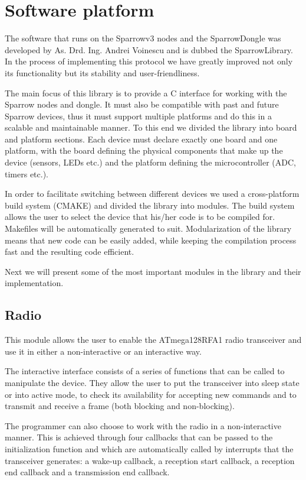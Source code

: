 
\chapter{Software platform}

The software that runs on the Sparrowv3 nodes and the SparrowDongle was
developed by As. Drd. Ing. Andrei Voinescu and is dubbed the SparrowLibrary.
In the process of implementing this protocol we have greatly improved not only
its functionality but its stability and user-friendliness.

The main focus of this library is to provide a C interface for working with the
Sparrow nodes and dongle. It must also be compatible with past and future
Sparrow devices, thus it must support multiple platforms and do this in a
scalable and maintainable manner. To this end we divided the library into board and platform
sections.  Each device must declare exactly one board and one platform, with
the board defining the physical components that make up the device (sensors,
LEDs etc.) and the platform defining the microcontroller (ADC, timers etc.). 

In order to facilitate switching between different devices we used a
cross-platform build system (CMAKE) and divided the library into modules. The
build system allows the user to select the device that his/her code is to be
compiled for. Makefiles will be automatically generated to suit. Modularization of the library means that new code can be easily added, while keeping the compilation process fast and the resulting code
efficient.

Next we will present some of the most important modules in the library and their
implementation.

\section{Radio}

This module allows the user to enable the ATmega128RFA1 radio transceiver and
use it in either a non-interactive or an interactive way. 

The interactive interface consists of a series of functions that can be called
to manipulate the device. They allow the user to put the transceiver into 
sleep state or into active mode, to check its availability for accepting new
commands and to transmit and receive a frame (both blocking and non-blocking).

The programmer can also choose to work with the radio in a non-interactive
manner. This is achieved through four callbacks that can be passed to the
initialization function and which are automatically called by interrupts that the
transceiver generates: a wake-up callback, a reception start callback, a
reception end callback and a transmission end callback.

